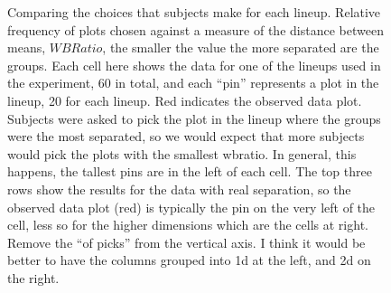 \documentclass[12]{article}
\newcommand{\blue}{\color{blue}}
\begin{document}
\begin{figure}[hbtp]
       \caption{Comparing the choices that subjects make for each lineup. Relative frequency of plots chosen against a measure of the distance between means, $WB Ratio$, the smaller the value the more separated are the groups. Each cell here shows the data for one of the lineups used in the experiment, 60 in total, and each ``pin'' represents a plot in the lineup, 20 for each lineup. Red indicates the observed data plot. Subjects were asked to pick the plot in the lineup where the groups were the most separated, so we would expect that more subjects would pick the plots with the smallest wbratio. In general, this happens, the tallest pins are in the left of each cell. The top three rows show the results for the data with real separation, so the observed data plot (red) is typically the pin on the very left of the cell, less so for the higher dimensions which are the cells at right. {\blue Remove the ``of picks'' from the vertical axis. I think it would be better to have the columns grouped into 1d at the left, and 2d on the right.}}
       \label{wbratio}
\end{figure}

\end{document}
